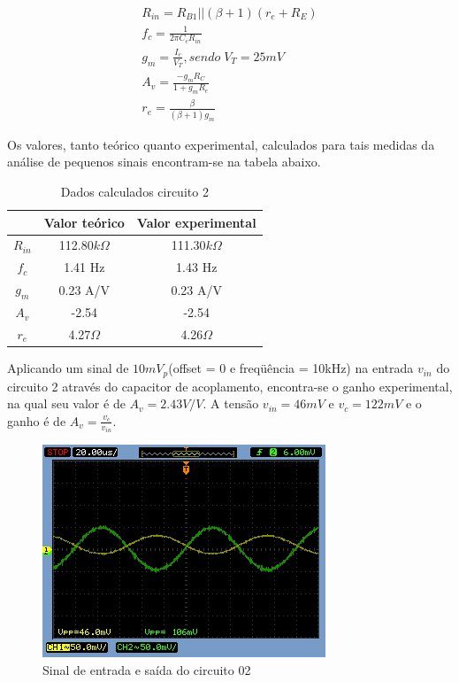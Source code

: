 \documentclass[a4paper]{article} %
\begin{document}
\begin{eqnarray}
R_{in}=R_{B1}||(\beta+1)(r_{e}+R_E)\\
f_c=\frac{1}{2\pi C_cR_{in}}\\
g_m=\frac{I_c}{V_T},sendo \; V_T = 25 mV\\
A_v=\frac{-g_mR_C}{1+g_mR_e}\\
r_{e}=\frac{\beta}{(\beta+1)g_m}
\end{eqnarray}

Os valores, tanto teórico quanto experimental, calculados para tais medidas da análise
de pequenos sinais encontram-se na tabela abaixo.

\begin{table}[h!]
\begin{centering}
\begin{tabular}{ccc}
\hline 
 & Valor teórico & Valor experimental\tabularnewline
\hline
\hline 
$R_{in}$ & 112.80$k\Omega$ & 111.30$k\Omega$\tabularnewline
$f_{c}$ & 1.41 Hz & 1.43 Hz\tabularnewline
$g_{m}$ & 0.23 A/V & 0.23 A/V\tabularnewline
$A_{v}$ & -2.54 & -2.54\tabularnewline
$r_{e}$ & 4.27$\Omega$ & 4.26$\Omega$\tabularnewline
\hline
\end{tabular}
\par\end{centering}

\caption{Dados calculados circuito 2}

\end{table}
%
Aplicando um sinal de $10mV_p$(offset = 0 e freqüência = 10kHz) na entrada $v_{in}$
do circuito 2 através do capacitor de acoplamento, encontra-se o ganho experimental, na qual seu
valor é de $A_v=2.43V/V$. A tensão $v_{in}=46mV$ e $v_c=122mV$ e o ganho é de  $A_v=\frac{v_c}{v_{in}}$.


\begin{figure}[h!]
\begin{centering}
\includegraphics[scale=0.5]{figuras03/3} \caption{Sinal de entrada e saída do circuito 02 \label{fig:3}}
\par\end{centering}
\end{figure}
\end{document}
